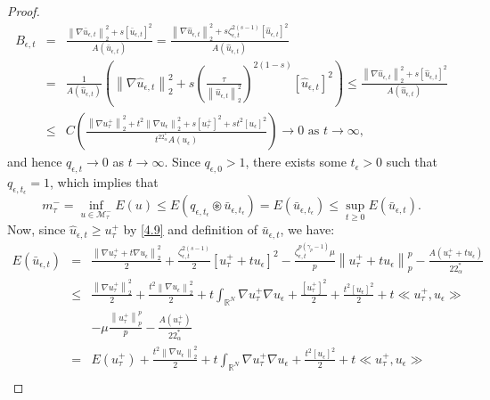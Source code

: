 \documentclass[11pt]{article}
\numberwithin{equation}{section}
\numberwithin{mytheorem}{section}
\begin{document}
\begin{proof}
			\begin{eqnarray*}
				B_{\epsilon,t} & = & \frac{\left\| \nabla \bar{u}_{\epsilon,t}\right\|_2^2+s[\bar{u}_{\epsilon,t}]^2}{A(\bar{u}_{\epsilon,t})}=\frac{\left\|\nabla \hat{u}_{\epsilon,t}\right\|_2^2+s\zeta_{\epsilon,t}^{2(s-1)}[\hat{u}_{\epsilon,t}]^2}{A(\hat{u}_{\epsilon,t})}\\
				& = &\frac{1}{A(\hat{u}_{\epsilon,t})}\left(\left\|\nabla \hat{u}_{\epsilon,t}\right\|_2^2+s\left(\frac{\tau}{\left\| \hat{u}_{\epsilon,t}\right\|_2^2}\right)^{2(1-s)}[\hat{u}_{\epsilon,t}]^2\right)\leq \frac{\left\| \nabla \hat{u}_{\epsilon,t}\right\|_2^2+s[\hat{u}_{\epsilon,t}]^2}{A(\hat{u}_{\epsilon,t})}\\
				& \leq & C\left(\frac{\left\| \nabla u_{\tau}^+\right\|_2^2+t^2\left\| \nabla u_{\epsilon}\right\|_2^2+s[u_{\tau}^+]^2+st^2[u_{\epsilon}]^2}{t^{22^*_{\alpha}}A(u_{\epsilon})}\right)\rightarrow 0 \text{ as } t\rightarrow\infty,
			\end{eqnarray*}
			and hence $q_{\epsilon,t}\rightarrow 0$ as $t\rightarrow\infty$. 
			Since $q_{\epsilon,0}>1$, there exists some $t_{\epsilon}>0$ such that $q_{\epsilon,t_{\epsilon}}=1$, which implies that
			\begin{equation}\label{4.11}
				m_{\tau}^-=\inf_{u\in \mathcal{M}_{\tau}^-}E(u)\leq E(q_{\epsilon,t_{\epsilon}}\circledast \bar{u}_{\epsilon,t_{\epsilon}})= E(\bar{u}_{\epsilon,t_{\epsilon}})\leq \sup_{t\geq 0}E(\bar{u}_{\epsilon,t}). 
			\end{equation}
			Now, since $\hat{u}_{\epsilon,t}\geq u_{\tau}^+$ by \eqref{4.9} and definition of $\bar{u}_{\epsilon,t}$, we have:
			\begin{eqnarray}\label{4.12}
				E(\bar{u}_{\epsilon,t}) & = & \frac{\left\| \nabla u_{\tau}^++t\nabla u_{\epsilon}\right\|_2^2}{2}+\frac{\zeta_{\epsilon,t}^{2(s-1)}}{2}[u_{\tau}^++tu_{\epsilon}]^2-\frac{\zeta_{\epsilon,t}^{p(\gamma_p-1)}\mu}{p}\left\| u_{\tau}^++tu_{\epsilon}\right\|_p^p-\frac{A(u_{\tau}^++tu_{\epsilon})}{22^*_{\alpha}}\nonumber\\		
				& \leq & \frac{\left\| \nabla u_{\tau}^+\right\|_2^2}{2}+\frac{t^2\left\| \nabla u_{\epsilon}\right\|_2^2}{2}+t\int_{\mathbb{R}^N}\nabla u_{\tau}^+\nabla u_{\epsilon} +\frac{[u_{\tau}^+]^2}{2}+\frac{t^2[u_{\epsilon}]^2}{2}+t\ll u_{\tau}^+, u_{\epsilon}\gg\nonumber\\
				&& -\mu\frac{\left\| u_{\tau}^+\right\|_p^p}{p}-\frac{A(u_{\tau}^+)}{22^*_{\alpha}} \nonumber\\
				& = & E(u_{\tau}^+)+\frac{t^2\left\| \nabla u_{\epsilon}\right\|_2^2}{2}+t\int_{\mathbb{R}^N}\nabla u_{\tau}^+\nabla u_{\epsilon}+\frac{t^2[u_{\epsilon}]^2}{2}+t\ll u_{\tau}^+, u_{\epsilon}\gg\nonumber\\

\end{eqnarray}
\end{proof}
\end{document}
